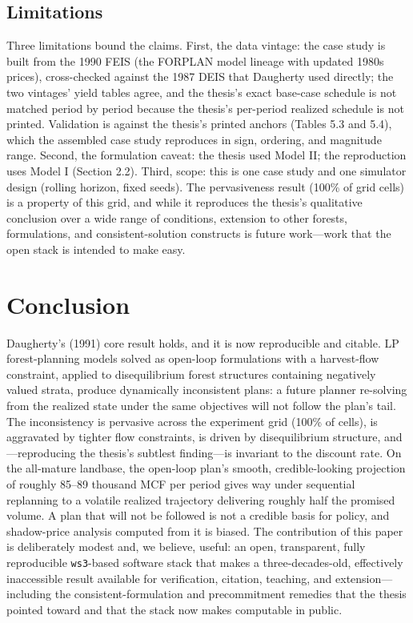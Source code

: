 \documentclass[12pt]{article}
\begin{document}
\hypertarget{limitations}{%
\subsection{Limitations}\label{limitations}}

Three limitations bound the claims. First, the data vintage: the case study is built from the 1990 FEIS (the FORPLAN model lineage with updated 1980s prices), cross-checked against the 1987 DEIS that Daugherty used directly; the two vintages' yield tables agree, and the thesis's exact base-case schedule is not matched period by period because the thesis's per-period realized schedule is not printed. Validation is against the thesis's printed anchors (Tables 5.3 and 5.4), which the assembled case study reproduces in sign, ordering, and magnitude range. Second, the formulation caveat: the thesis used Model II; the reproduction uses Model I (Section 2.2). Third, scope: this is one case study and one simulator design (rolling horizon, fixed seeds). The pervasiveness result (100\% of grid cells) is a property of this grid, and while it reproduces the thesis's qualitative conclusion over a wide range of conditions, extension to other forests, formulations, and consistent-solution constructs is future work---work that the open stack is intended to make easy.

\hypertarget{conclusion}{%
\section{Conclusion}\label{conclusion}}

Daugherty's (1991) core result holds, and it is now reproducible and citable. LP forest-planning models solved as open-loop formulations with a harvest-flow constraint, applied to disequilibrium forest structures containing negatively valued strata, produce dynamically inconsistent plans: a future planner re-solving from the realized state under the same objectives will not follow the plan's tail. The inconsistency is pervasive across the experiment grid (100\% of cells), is aggravated by tighter flow constraints, is driven by disequilibrium structure, and---reproducing the thesis's subtlest finding---is invariant to the discount rate. On the all-mature landbase, the open-loop plan's smooth, credible-looking projection of roughly 85--89 thousand MCF per period gives way under sequential replanning to a volatile realized trajectory delivering roughly half the promised volume. A plan that will not be followed is not a credible basis for policy, and shadow-price analysis computed from it is biased. The contribution of this paper is deliberately modest and, we believe, useful: an open, transparent, fully reproducible \texttt{ws3}-based software stack that makes a three-decades-old, effectively inaccessible result available for verification, citation, teaching, and extension---including the consistent-formulation and precommitment remedies that the thesis pointed toward and that the stack now makes computable in public.
\end{document}
